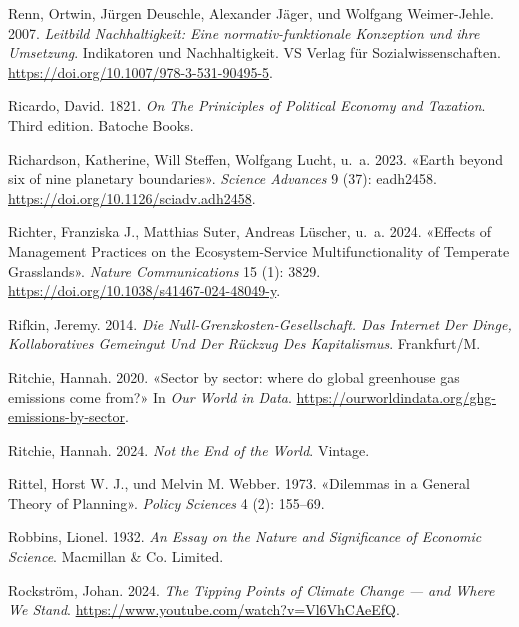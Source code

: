 \documentclass[
  nswissgerman,
  a4paper,
  openany]{book}
\newlength{\cslhangindent}
\newenvironment{CSLReferences}[2] %
 {\begin{list}{}{%
  \setlength{\itemindent}{0pt}
  \setlength{\leftmargin}{0pt}
  \setlength{\parsep}{0pt}
  \ifodd #1
   \setlength{\leftmargin}{\cslhangindent}
   \setlength{\itemindent}{-1\cslhangindent}
  \fi
  \setlength{\itemsep}{#2\baselineskip}}}
 {\end{list}}
\begin{document}
\begin{CSLReferences}{1}{1}
Renn, Ortwin, Jürgen Deuschle, Alexander Jäger, und Wolfgang
Weimer-Jehle. 2007. \emph{{Leitbild Nachhaltigkeit: Eine
normativ-funktionale Konzeption und ihre Umsetzung}}. {Indikatoren und
Nachhaltigkeit}. VS Verlag f{ü}r Sozialwissenschaften.
\url{https://doi.org/10.1007/978-3-531-90495-5}.

Ricardo, David. 1821. \emph{On {The Priniciples} of {Political Economy}
and {Taxation}}. Third edition. Batoche Books.

Richardson, Katherine, Will Steffen, Wolfgang Lucht, u.~a. 2023. {«Earth
beyond six of nine planetary boundaries»}. \emph{Science Advances} 9
(37): eadh2458. \url{https://doi.org/10.1126/sciadv.adh2458}.

Richter, Franziska J., Matthias Suter, Andreas Lüscher, u.~a. 2024.
{«Effects of Management Practices on the Ecosystem-Service
Multifunctionality of Temperate Grasslands»}. \emph{Nature
Communications} 15 (1): 3829.
\url{https://doi.org/10.1038/s41467-024-48049-y}.

Rifkin, Jeremy. 2014. \emph{Die {Null-Grenzkosten-Gesellschaft}. {Das
Internet} Der {Dinge}, Kollaboratives {Gemeingut} Und Der {R{ü}ckzug}
Des {Kapitalismus}}. Frankfurt/M.

Ritchie, Hannah. 2020. {«Sector by sector: where do global greenhouse
gas emissions come from?»} In \emph{Our World in Data}.
\url{https://ourworldindata.org/ghg-emissions-by-sector}.

Ritchie, Hannah. 2024. \emph{Not the {End} of the {World}}. Vintage.

Rittel, Horst W. J., und Melvin M. Webber. 1973. {«Dilemmas in a
{General Theory} of {Planning}»}. \emph{Policy Sciences} 4 (2): 155--69.

Robbins, Lionel. 1932. \emph{An {Essay} on the {Nature} and
{Significance} of {Economic Science}}. Macmillan \& Co. Limited.

Rockström, Johan. 2024. \emph{The {Tipping} {Points} of {Climate}
{Change} --- and {Where} {We} {Stand}}.
\url{https://www.youtube.com/watch?v=Vl6VhCAeEfQ}.


\end{CSLReferences}
\end{document}
